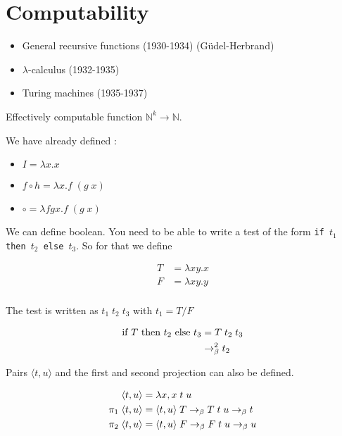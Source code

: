 \section{Computability}

  \begin{itemize}
    \item General recursive functions (1930-1934) (Güdel-Herbrand)

    \item $\lambda$-calculus (1932-1935)

    \item Turing machines (1935-1937)
  \end{itemize}

  Effectively computable function $\mathbb N^k \to \mathbb N$.

  We have already defined :

  \begin{itemize}
    \item $I = \lambda x. x$
    \item $f \circ h = \lambda x. f\; (g\;x)$
    \item $\circ = \lambda fgx. f\; (g\;x)$
  \end{itemize}

  We can define boolean. You need to be able to write a test of the form
  \texttt{if $t_1$ then $t_2$ else $t_3$}. So for that we define 

  \begin{align*}
    T &= \lambda xy.x \\
    F &= \lambda xy.y \\
  \end{align*}

  The test is written as $t_1\;t_2\;t_3$ with $t_1 = T / F$

  \begin{align*}
    \text{if } T \text{ then } t_2 \text{ else } t_3 &= T\;t_2\;t_3 \\
    &\to_\beta^2 t_2
  \end{align*}

  Pairs $\langle t, u \rangle$ and the first and second projection can also be defined.

  \begin{align*}
    \langle t, u \rangle &= \lambda x, x\;t\;u \\
    \pi_1\; \langle t, u \rangle &= \langle t, u \rangle\;T \to_\beta T\;t\;u \to_\beta t \\
    \pi_2\; \langle t, u \rangle &= \langle t, u \rangle\;F \to_\beta F\;t\;u \to_\beta u
  \end{align*}

